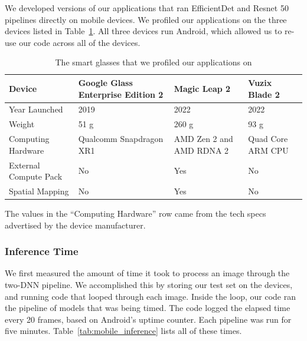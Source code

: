We developed versions of our applications that ran EfficientDet and Resnet 50
pipelines directly on mobile devices.
We profiled our applications on the three devices listed in
Table~\ref{tab:devices}.
All three devices run Android, which allowed us to re-use our code across all of
the devices.

\begin{table}
\begin{tabular}{|l||p{3.5cm}|p{3.5cm}|p{3.5cm}|}
  \hline
  Device & Google Glass Enterprise Edition 2 & Magic Leap 2 & Vuzix Blade 2\\
  \hline
  \hline
  Year Launched & 2019 & 2022 & 2022\\
  Weight & 51 g & 260 g & 93 g\\
  Computing Hardware & Qualcomm Snapdragon XR1 & AMD Zen 2 and AMD RDNA 2 & Quad Core ARM CPU\\
  External Compute Pack & No & Yes & No\\
  Spatial Mapping & No & Yes & No\\
  \hline
\end{tabular}
  \begin{captiontext}
    The values in the
    ``Computing Hardware'' row came from the tech specs advertised by the device
    manufacturer.
  \end{captiontext}
  \caption{
    The smart glasses that we profiled our applications on
  }\label{tab:devices}
\end{table}

\subsubsection{Inference Time}\label{sec:mobile_inf_time}

We first measured the amount of time it took to process an image through the
two-DNN pipeline.
We accomplished this by storing our test set on the devices, and running code
that looped through each image.
Inside the loop, our code ran the pipeline of models that was being timed.
The code logged the elapsed time every 20 frames, based on Android's uptime
counter.
Each pipeline was run for five minutes.
Table~\ref{tab:mobile_inference} lists all of these times.

